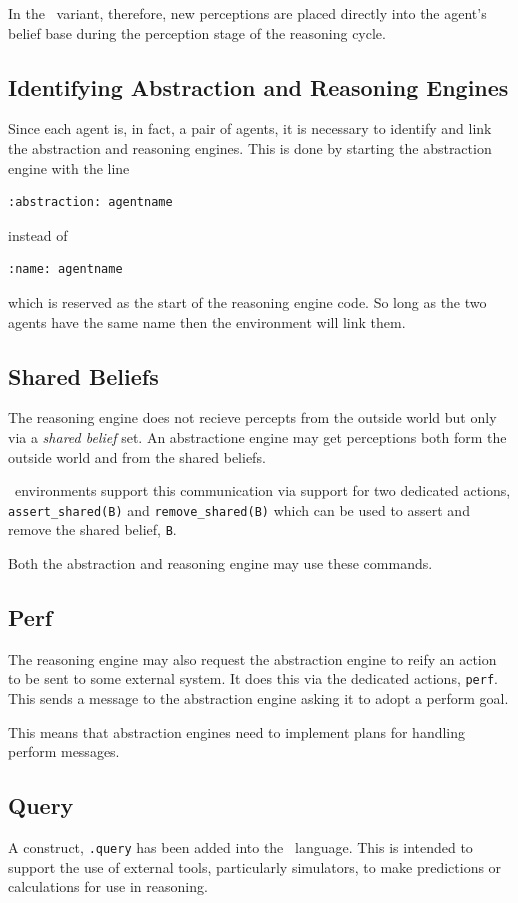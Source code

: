 \documentclass[a4]{article}
\begin{document}
In the \eass\ variant, therefore, new perceptions are placed directly into the agent's belief base during the perception stage of the reasoning cycle.

\subsection{Identifying Abstraction and Reasoning Engines}
Since each agent is, in fact, a pair of agents, it is necessary to identify and link the abstraction and reasoning engines.  This is done by starting the abstraction engine with the line
\begin{verbatim}
:abstraction: agentname
\end{verbatim} 
instead of 
\begin{verbatim}
:name: agentname
\end{verbatim} 
which is reserved as the start of the reasoning engine code.  So long as the two agents have the same name then the environment will link them.

\subsection{Shared Beliefs}
The reasoning engine does not recieve percepts from the outside world but only via a \emph{shared belief} set.  An abstractione engine may get perceptions both form the outside world and from the shared beliefs.

\eass\ environments support this communication via support for two dedicated actions, \lstinline{assert_shared(B)} and \lstinline{remove_shared(B)} which can be used to assert and remove the shared belief, \lstinline{B}.

Both the abstraction and reasoning engine may use these commands.

\subsection{Perf}
The reasoning engine may also request the abstraction engine to reify an action to be sent to some external system.  It does this via the dedicated actions, \texttt{perf}.  This sends a message to the abstraction engine asking it to adopt a perform goal.

This means that abstraction engines need to implement plans for handling perform messages.

\subsection{Query}
A construct, \texttt{.query} has been added into the \eass\ language.  This is intended to support the use of external tools, particularly simulators, to make predictions or calculations for use in reasoning.  
\end{document}
